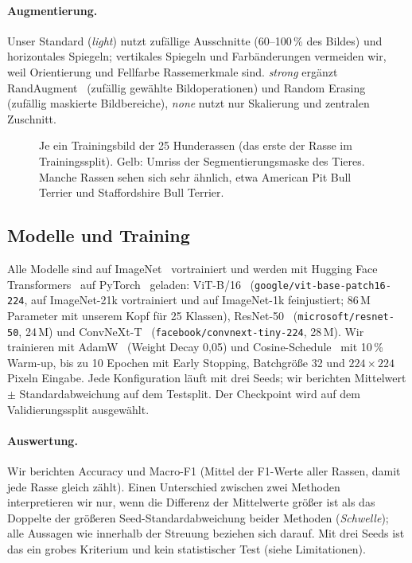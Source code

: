 \paragraph{Augmentierung.}
Unser Standard (\emph{light}) nutzt zufällige Ausschnitte (60--100\,\% des Bildes) und horizontales
Spiegeln; vertikales Spiegeln und Farbänderungen vermeiden wir, weil Orientierung und Fellfarbe
Rassemerkmale sind. \emph{strong} ergänzt RandAugment~\cite{cubuk2020randaugment} (zufällig gewählte Bildoperationen) und Random
Erasing~\cite{zhong2020erasing} (zufällig maskierte Bildbereiche), \emph{none} nutzt nur Skalierung und zentralen Zuschnitt.

\begin{figure}[t]
  \centering
  \caption{Je ein Trainingsbild der 25 Hunderassen (das erste der Rasse im Trainingssplit). Gelb: Umriss der
  Segmentierungsmaske des Tieres. Manche Rassen sehen sich sehr ähnlich, etwa American Pit Bull Terrier und
  Staffordshire Bull Terrier.}
  \label{fig:examples}
\end{figure}

\subsection{Modelle und Training}
Alle Modelle sind auf ImageNet~\cite{deng2009imagenet,russakovsky2015imagenet} vortrainiert und werden mit Hugging Face
Transformers~\cite{wolf2020transformers} auf PyTorch~\cite{paszke2019pytorch} geladen: ViT-B/16~\cite{dosovitskiy2021vit}
(\texttt{google/vit-base-patch16-224}, auf ImageNet-21k vortrainiert und auf ImageNet-1k feinjustiert; 86\,M Parameter mit unserem Kopf für 25 Klassen), ResNet-50~\cite{he2016resnet}
(\texttt{microsoft/resnet-50}, 24\,M) und ConvNeXt-T~\cite{liu2022convnext} (\texttt{facebook/convnext-tiny-224}, 28\,M). Wir
trainieren mit AdamW~\cite{loshchilov2019adamw} (Weight Decay 0,05) und Cosine-Schedule~\cite{loshchilov2017sgdr}
mit 10\,\% Warm-up, bis zu 10 Epochen mit
Early Stopping, Batchgröße 32 und $224\times224$ Pixeln Eingabe. Jede Konfiguration läuft mit drei Seeds;
wir berichten Mittelwert $\pm$ Standardabweichung auf dem Testsplit. Der Checkpoint wird auf dem
Validierungssplit ausgewählt.

\paragraph{Auswertung.}
Wir berichten Accuracy und Macro-F1 (Mittel der F1-Werte aller Rassen, damit jede Rasse gleich
zählt). Einen Unterschied zwischen zwei Methoden interpretieren wir nur, wenn
die Differenz der Mittelwerte größer ist als das Doppelte der größeren Seed-Standardabweichung beider
Methoden (\emph{Schwelle}); alle Aussagen wie \glqq innerhalb der Streuung\grqq{} beziehen sich darauf. Mit drei
Seeds ist das ein grobes Kriterium und kein statistischer Test (siehe Limitationen).

